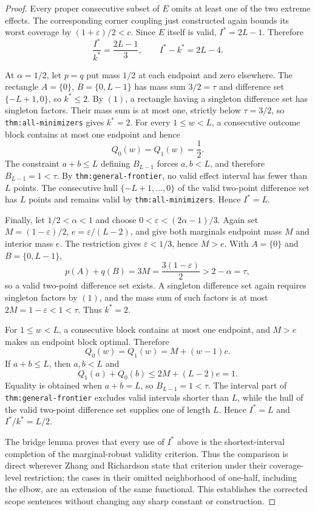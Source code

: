 \documentclass{article}
\begin{document}
\begin{proof}
Every proper consecutive subset of \(E\) omits at least one of the two extreme effects.  The corresponding corner coupling just constructed again bounds its worst coverage by \((1+\varepsilon)/2<c\).  Since \(E\) itself is valid, \(I^*=2L-1\).  Therefore
\[
\frac{I^*}{k^*}=\frac{2L-1}{3},
\qquad
I^*-k^*=2L-4.
\tag{11}
\]

At \(\alpha=1/2\), let \(p=q\) put mass \(1/2\) at each endpoint and zero elsewhere.  The rectangle \(A=\{0\}\), \(B=\{0,L-1\}\) has mass sum \(3/2=\tau\) and difference set \(\{-L+1,0\}\), so \(k^*\leq2\).  By \((1)\), a rectangle having a singleton difference set has singleton factors.  Their mass sum is at most one, strictly below \(\tau=3/2\), so \texttt{thm:all-minimizers} gives \(k^*=2\).  For every \(1\leq w<L\), a consecutive outcome block contains at most one endpoint and hence
\[
Q_0(w)=Q_1(w)=\frac12.
\]
The constraint \(a+b\leq L\) defining \(B_{L-1}\) forces \(a,b<L\), and therefore \(B_{L-1}=1<\tau\).  By \texttt{thm:general-frontier}, no valid effect interval has fewer than \(L\) points.  The consecutive hull \(\{-L+1,\ldots,0\}\) of the valid two-point difference set has \(L\) points and remains valid by \texttt{thm:all-minimizers}.  Hence \(I^*=L\).

Finally, let \(1/2<\alpha<1\) and choose \(0<\varepsilon<(2\alpha-1)/3\).  Again set \(M=(1-\varepsilon)/2\), \(e=\varepsilon/(L-2)\), and give both marginals endpoint mass \(M\) and interior mass \(e\).  The restriction gives \(\varepsilon<1/3\), hence \(M>e\).  With \(A=\{0\}\) and \(B=\{0,L-1\}\),
\[
p(A)+q(B)=3M=\frac{3(1-\varepsilon)}2>2-\alpha=\tau,
\]
so a valid two-point difference set exists.  A singleton difference set again requires singleton factors by \((1)\), and the mass sum of such factors is at most \(2M=1-\varepsilon<1<\tau\).  Thus \(k^*=2\).

For \(1\leq w<L\), a consecutive block contains at most one endpoint, and \(M>e\) makes an endpoint block optimal.  Therefore
\[
Q_0(w)=Q_1(w)=M+(w-1)e.
\]
If \(a+b\leq L\), then \(a,b<L\) and
\[
Q_1(a)+Q_0(b)
\leq2M+(L-2)e=1.
\]
Equality is obtained when \(a+b=L\), so \(B_{L-1}=1<\tau\).  The interval part of \texttt{thm:general-frontier} excludes valid intervals shorter than \(L\), while the hull of the valid two-point difference set supplies one of length \(L\).  Hence \(I^*=L\) and \(I^*/k^*=L/2\).

The bridge lemma proves that every use of \(I^*\) above is the shortest-interval completion of the marginal-robust validity criterion.  Thus the comparison is direct wherever Zhang and Richardson state that criterion under their coverage-level restriction; the cases in their omitted neighborhood of one-half, including the elbow, are an extension of the same functional.  This establishes the corrected scope sentences without changing any sharp constant or construction.
\end{proof}
\end{document}
